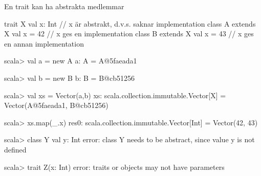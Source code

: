 \begin{Slide}{En trait kan ha abstrakta medlemmar}
\begin{Code}
trait X { val x: Int }   // x är abstrakt, d.v.s. saknar implementation
class A extends X { val x = 42 }   // x ges en implementation
class B extends X { val x = 43 }   // x ges en annan implementation
\end{Code}
\pause\vspace{-0.5em}
\begin{REPL}
scala> val a = new A
a: A = A@5faeada1

scala> val b = new B
b: B = B@cb51256

scala> val xs = Vector(a,b)
xs: scala.collection.immutable.Vector[X] = Vector(A@5faeada1, B@cb51256)

scala> xs.map(_.x)
res0: scala.collection.immutable.Vector[Int] = Vector(42, 43)

scala> class Y { val y: Int }
  error: class Y needs to be abstract, since value y is not defined

scala> trait Z(x: Int)
  error: traits or objects may not have parameters

\end{REPL}
\end{Slide}


